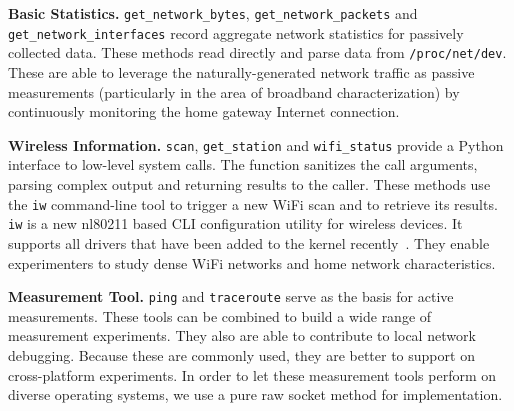 {\raggedright
\textbf{Basic Statistics.} \texttt{get\_network\_bytes}, \texttt{get\_network\_packets} and \texttt{get\_network\_interfaces} record aggregate network statistics for passively collected data. These methods read directly and parse data from \texttt{/proc/net/dev}. These are able to leverage the naturally-generated network traffic as passive measurements (particularly in the area of broadband characterization) by continuously monitoring the home gateway Internet connection.

\textbf{Wireless Information.} \texttt{scan}, \texttt{get\_station} and \texttt{wifi\_status} provide a Python interface to low-level system calls. The function sanitizes the call arguments, parsing complex output and returning results to the caller. These methods use the \texttt{iw} command-line tool to trigger a new WiFi scan and to retrieve its results. \texttt{iw} is a new nl80211 based CLI configuration utility for wireless devices. It supports all drivers that have been added to the kernel recently~\cite{iw}. They enable experimenters to study dense WiFi networks and home network characteristics.

\textbf{Measurement Tool.} \texttt{ping} and \texttt{traceroute} serve as the basis for active measurements. These tools can be combined to build a wide range of measurement experiments. They also are able to contribute to local network debugging. Because these are commonly used, they are better to support on cross-platform experiments. In order to let these measurement tools perform on diverse operating systems, we use a pure raw socket method for implementation. 


}

